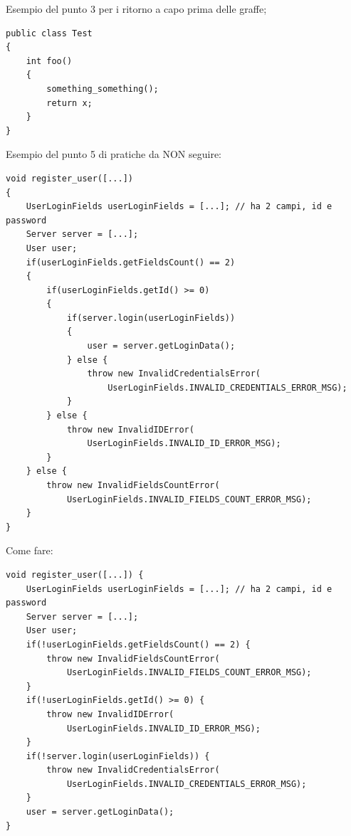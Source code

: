 \documentclass{article}
\begin{document}
Esempio del punto 3 per i ritorno a capo prima delle graffe;
\begin{verbatim}
public class Test 
{
    int foo() 
    {
        something_something();
        return x;
    }
}
\end{verbatim}
Esempio del punto 5 di pratiche da NON seguire:
\begin{verbatim}
void register_user([...]) 
{
    UserLoginFields userLoginFields = [...]; // ha 2 campi, id e password
    Server server = [...];
    User user;
    if(userLoginFields.getFieldsCount() == 2) 
    {
        if(userLoginFields.getId() >= 0) 
        {
            if(server.login(userLoginFields)) 
            {
                user = server.getLoginData();
            } else {
                throw new InvalidCredentialsError(
                    UserLoginFields.INVALID_CREDENTIALS_ERROR_MSG);
            }
        } else {
            throw new InvalidIDError(
                UserLoginFields.INVALID_ID_ERROR_MSG);
        }
    } else {
        throw new InvalidFieldsCountError(
            UserLoginFields.INVALID_FIELDS_COUNT_ERROR_MSG);
    }
}
\end{verbatim}
Come fare:
\begin{verbatim}
void register_user([...]) {
    UserLoginFields userLoginFields = [...]; // ha 2 campi, id e password
    Server server = [...];
    User user;
    if(!userLoginFields.getFieldsCount() == 2) {
        throw new InvalidFieldsCountError(
            UserLoginFields.INVALID_FIELDS_COUNT_ERROR_MSG);
    }
    if(!userLoginFields.getId() >= 0) {
        throw new InvalidIDError(
            UserLoginFields.INVALID_ID_ERROR_MSG);
    }
    if(!server.login(userLoginFields)) {
        throw new InvalidCredentialsError(
            UserLoginFields.INVALID_CREDENTIALS_ERROR_MSG);
    }
    user = server.getLoginData();
}
\end{verbatim}
\end{document}
